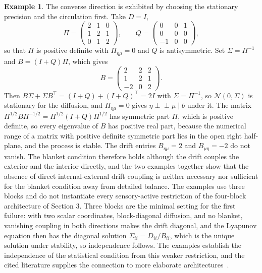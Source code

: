 \documentclass[11pt]{article}
\theoremstyle{definition}
\newtheorem{example}{Example}
\newcommand{\Ind}{\perp\!\!\!\perp}
\begin{document}
\begin{example}
The converse direction is exhibited by choosing the stationary precision and the circulation first. Take $D=I$,
\[
\Pi=\begin{pmatrix} 2&1&0\\ 1&2&1\\ 0&1&2\end{pmatrix},\qquad
Q=\begin{pmatrix} 0&0&1\\ 0&0&0\\ -1&0&0\end{pmatrix},
\]
so that $\Pi$ is positive definite with $\Pi_{\eta\mu}=0$ and $Q$ is antisymmetric. Set $\Sigma=\Pi^{-1}$ and $B=(I+Q)\Pi$, which gives
\[
B=\begin{pmatrix} 2&2&2\\ 1&2&1\\ -2&0&2\end{pmatrix}.
\]
Then $B\Sigma+\Sigma B^{\top}=(I+Q)+(I+Q)^{\top}=2I$ with $\Sigma=\Pi^{-1}$, so $\mathcal N(0,\Sigma)$ is stationary for the diffusion, and $\Pi_{\eta\mu}=0$ gives $\eta\Ind\mu\mid b$ under it. The matrix $\Pi^{1/2}B\Pi^{-1/2}=\Pi^{1/2}(I+Q)\Pi^{1/2}$ has symmetric part $\Pi$, which is positive definite, so every eigenvalue of $B$ has positive real part, because the numerical range of a matrix with positive definite symmetric part lies in the open right half-plane, and the process is stable. The drift entries $B_{\eta\mu}=2$ and $B_{\mu\eta}=-2$ do not vanish. The blanket condition therefore holds although the drift couples the exterior and the interior directly, and the two examples together show that the absence of direct internal-external drift coupling is neither necessary nor sufficient for the blanket condition away from detailed balance. The examples use three blocks and do not instantiate every sensory-active restriction of the four-block architecture of Section 3. Three blocks are the minimal setting for the first failure: with two scalar coordinates, block-diagonal diffusion, and no blanket, vanishing coupling in both directions makes the drift diagonal, and the Lyapunov equation then has the diagonal solution $\Sigma_{ii}=D_{ii}/B_{ii}$, which is the unique solution under stability, so independence follows. The examples establish the independence of the statistical condition from this weaker restriction, and the cited literature supplies the connection to more elaborate architectures~\cite{biehl2021,heins2022}.
\end{example}
\end{document}

